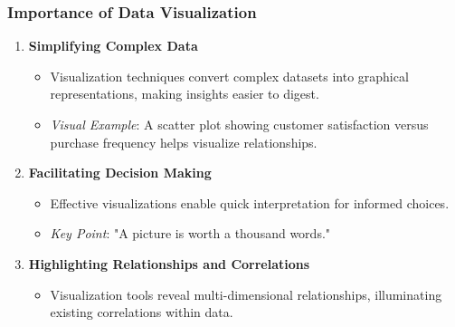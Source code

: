 \documentclass[aspectratio=169]{beamer}
\begin{document}
\begin{frame}[fragile]
    \frametitle{Importance of Data Visualization}
    \begin{enumerate}
        \item \textbf{Simplifying Complex Data}
        \begin{itemize}
            \item Visualization techniques convert complex datasets into graphical representations, making insights easier to digest.
            \item \textit{Visual Example}: A scatter plot showing customer satisfaction versus purchase frequency helps visualize relationships.
        \end{itemize}
        
        \item \textbf{Facilitating Decision Making}
        \begin{itemize}
            \item Effective visualizations enable quick interpretation for informed choices.
            \item \textit{Key Point}: "A picture is worth a thousand words."
        \end{itemize}

        \item \textbf{Highlighting Relationships and Correlations}
        \begin{itemize}
            \item Visualization tools reveal multi-dimensional relationships, illuminating existing correlations within data.
        \end{itemize}
    \end{enumerate}
\end{frame}
\end{document}
